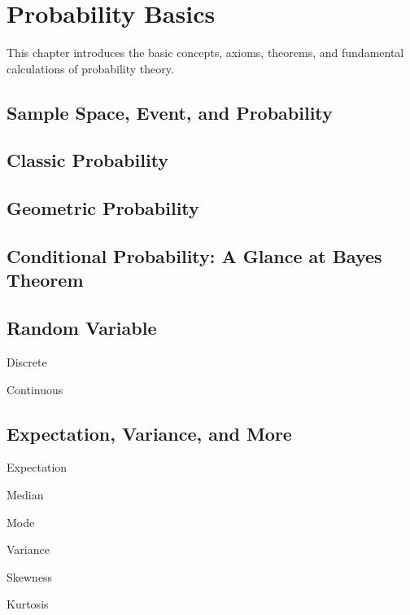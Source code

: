 \chapter{Probability Basics} \label{ch:pb}

This chapter introduces the basic concepts, axioms, theorems, and fundamental calculations of probability theory.

\section{Sample Space, Event, and Probability}

\section{Classic Probability}

\section{Geometric Probability}

\section{Conditional Probability: A Glance at Bayes Theorem}


\section{Random Variable}

Discrete

Continuous 

\section{Expectation, Variance, and More}

Expectation

Median

Mode

Variance

Skewness

Kurtosis



